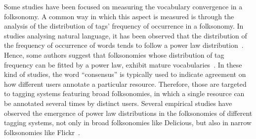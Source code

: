 Some studies have been focused on measuring the vocabulary convergence in a folksonomy.
A common way in which this aspect is measured is through the analysis of the distribution of tags' frequency of occurrence in a folksonomy. In studies analysing natural language, it has been observed that the distribution of the frequency of occurrence of words tends to follow a power law distribution~\citep{Sole2005,Cattuto2006}. Hence, some authors suggest that folksonomies whose distribution of tag frequency can be fitted by a power law, exhibit mature vocabularies~\citep{Mathes2004,Cattuto2006,halpin2006,Wagner2014}. In these kind of studies, the word ``consensus'' is typically used to indicate agreement on how different users annotate a particular resource. Therefore, those are targeted to tagging systems featuring broad folksonomies, in which a single resource can be annotated several times by distinct users. 
Several empirical studies have observed the emergence of power law distributions in the folksonomies of different tagging systems, not only in broad folksonomies like Delicious, but also in narrow folksonomies like Flickr~\citep{Cattuto2006,halpin2006,Guy2006,Sigurbjornsson2008,Robu2009,Wagner2014}. %


